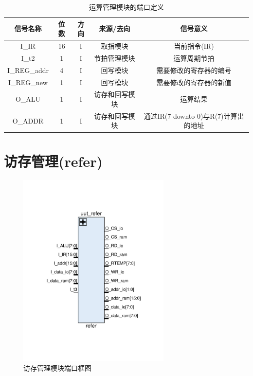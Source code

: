 \documentclass[forprint]{WHUBachelor}
\begin{document}
\begin{table}[ht]
  \centering
  \begin{tabular}{c c c c c}
    \hline
    信号名称 & 位数 & 方向 & 来源/去向 & 信号意义 \\
    \hline
    I\_IR & 16 & I & 取指模块 & 当前指令(IR) \\
    I\_t2 & 1 & I & 节拍管理模块 & 运算周期节拍 \\
    I\_REG\_addr & 4 & I & 回写模块 & 需要修改的寄存器的编号 \\
    I\_REG\_new & 1 & I & 回写模块 & 需要修改的寄存器的新值 \\
    O\_ALU & 1 & I & 访存和回写模块 & 运算结果 \\
    O\_ADDR & 1 & I & 访存和回写模块 & 通过IR(7 downto 0)与R(7)计算出的地址 \\
    \hline
  \end{tabular}
  \caption{运算管理模块的端口定义}
  \label{tab:ports:alu}
\end{table}

\section{访存管理(refer)}

\begin{figure}[H]
  \centering
  \includegraphics[width=3in]{figures/ports/refer.pdf}
  \caption{访存管理模块端口框图}
  \label{fig:ports:refer}
\end{figure}
\end{document}
